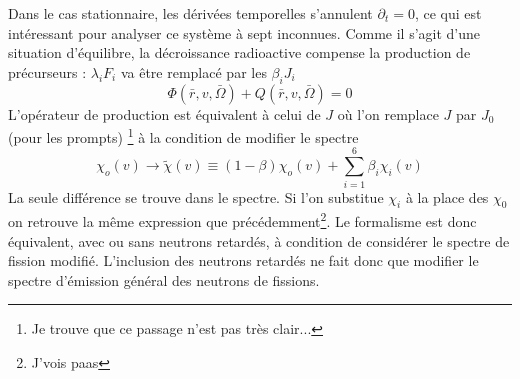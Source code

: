 
Dans le cas stationnaire, les dérivées temporelles s'annulent $\partial_t = 0$, ce qui est intéressant
pour analyser ce système à sept inconnues. Comme il s'agit d'une situation d'équilibre, la 
décroissance radioactive compense la production de précurseurs : $\lambda_i F_i$ va être 
remplacé par les $\beta_iJ_i$
\begin{equation}
[(1 - \beta ){J_o} - K + \sum\limits_{i = 1}^6    {\beta _i}{J_i}]\varPhi (\bar r,v,\bar \Omega ) + Q(\bar r,v,\bar \Omega ) = 0
\end{equation}
L'opérateur de production est équivalent à celui de $J$ où l'on remplace $J$ par $J_0$ (pour les 
prompts)
\footnote{Je trouve que ce passage n'est pas très clair...} à la condition de modifier le spectre
\begin{equation}
{\chi _o}(v) \to \tilde \chi (v) \equiv (1 - \beta ){\chi _o}(v) + \sum\limits_{i = 1}^6    {\beta _i}{\chi _i}(v)
\end{equation}
La seule différence se trouve dans le spectre. Si l'on substitue $\chi_i$ à la place des 
$\chi_0$ on retrouve la même expression que précédemment\footnote{J'vois paas}. Le formalisme est 
donc équivalent, avec ou sans neutrons retardés, à condition de considérer le spectre de fission 
modifié. L'inclusion des neutrons retardés ne fait donc que modifier le spectre d'émission 
général des neutrons de fissions.



